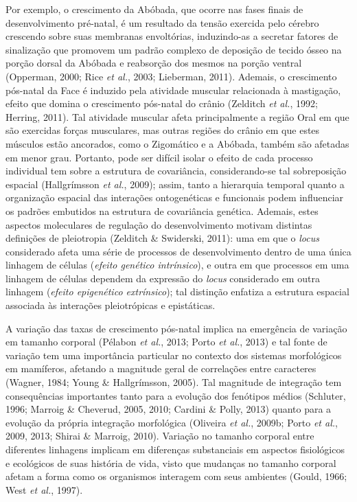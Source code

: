 \documentclass[12pt,twoside]{report}
\begin{document}
Por exemplo, o crescimento da Abóbada, que ocorre nas fases finais de
desenvolvimento pré-natal, é um resultado da tensão exercida pelo
cérebro crescendo sobre suas membranas envoltórias, induzindo-as a
secretar fatores de sinalização que promovem um padrão complexo de
deposição de tecido ósseo na porção dorsal da Abóbada e reabsorção dos
mesmos na porção ventral (Opperman, 2000; Rice \emph{et al.}, 2003;
Lieberman, 2011). Ademais, o crescimento pós-natal da Face é induzido
pela atividade muscular relacionada à mastigação, efeito que domina o
crescimento pós-natal do crânio (Zelditch \emph{et al.}, 1992; Herring,
2011). Tal atividade muscular afeta principalmente a região Oral em que
são exercidas forças musculares, mas outras regiões do crânio em que
estes músculos estão ancorados, como o Zigomático e a Abóbada, também
são afetadas em menor grau. Portanto, pode ser difícil isolar o efeito
de cada processo individual tem sobre a estrutura de covariância,
considerando-se tal sobreposição espacial (Hallgrímsson \emph{et al.},
2009); assim, tanto a hierarquia temporal quanto a organização espacial
das interações ontogenéticas e funcionais podem influenciar os padrões
embutidos na estrutura de covariância genética. Ademais, estes aspectos
moleculares de regulação do desenvolvimento motivam distintas definições
de pleiotropia (Zelditch \& Swiderski, 2011): uma em que o \emph{locus}
considerado afeta uma série de processos de desenvolvimento dentro de
uma única linhagem de células (\emph{efeito genético intrínsico}), e
outra em que processos em uma linhagem de células dependem da expressão
do \emph{locus} considerado em outra linhagem (\emph{efeito epigenético
extrínsico}); tal distinção enfatiza a estrutura espacial associada às
interações pleiotrópicas e epistáticas.

A variação das taxas de crescimento pós-natal implica na emergência de
variação em tamanho corporal (Pélabon \emph{et al.}, 2013; Porto
\emph{et al.}, 2013) e tal fonte de variação tem uma importância
particular no contexto dos sistemas morfológicos em mamíferos, afetando
a magnitude geral de correlações entre caracteres (Wagner, 1984; Young
\& Hallgrímsson, 2005). Tal magnitude de integração tem consequências
importantes tanto para a evolução dos fenótipos médios (Schluter, 1996;
Marroig \& Cheverud, 2005, 2010; Cardini \& Polly, 2013) quanto para a
evolução da própria integração morfológica (Oliveira \emph{et al.},
2009b; Porto \emph{et al.}, 2009, 2013; Shirai \& Marroig, 2010).
Variação no tamanho corporal entre diferentes linhagens implicam em
diferenças substanciais em aspectos fisiológicos e ecológicos de suas
história de vida, visto que mudanças no tamanho corporal afetam a forma
como os organismos interagem com seus ambientes (Gould, 1966; West
\emph{et al.}, 1997).
\end{document}
